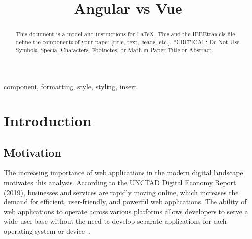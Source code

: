 \documentclass[conference]{IEEEtran}
\begin{document}
\title{Angular vs Vue\\
}

\author{
\and
{}
\and
{}
}

\maketitle

\begin{abstract}
This document is a model and instructions for \LaTeX.
This and the IEEEtran.cls file define the components of your paper [title, text, heads, etc.]. *CRITICAL: Do Not Use Symbols, Special Characters, Footnotes, 
or Math in Paper Title or Abstract.
\end{abstract}

\begin{IEEEkeywords}
component, formatting, style, styling, insert
\end{IEEEkeywords}
\section{Introduction}
\label{cha:Introduction}


\subsection{Motivation}
The increasing importance of web applications in the modern digital landscape motivates this analysis. According to the UNCTAD Digital Economy Report (2019), businesses and services are rapidly moving online, which increases the demand for efficient, user-friendly, and powerful web applications. The ability of web applications to operate across various platforms allows developers to serve a wide user base without the need to develop separate applications for each operating system or device~\cite{unctad}.
\newline
\end{document}
